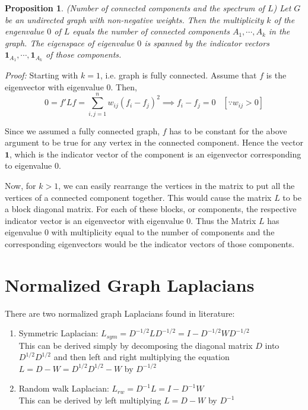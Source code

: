 \documentclass[10pt,a4paper, nocenter]{report}
\newtheorem{prop}{Proposition}
\begin{document}
			\begin{prop}
				(Number of connected components and the spectrum of $L$) Let $G$ be an undirected graph with non-negative weights. Then the multiplicity $k$ of the engenvalue $0$ of $L$ equals the number of connected components $A_{1},\cdots,A_{k}$ in the graph. The eigenspace of eigenvalue $0$ is spanned by the indicator vectors $\mathbf{1}_{A_{1}},\cdots,\mathbf{1}_{A_{k}}$ of those components.				
			\end{prop}
			\textit{Proof:}
			Starting with $k=1$, i.e. graph is fully connected. Assume that $f$ is the eigenvector with eigenvalue $0$. Then,
			$$ 0 = f'Lf = \sum_{i,j=1}^{n}w_{ij}(f_{i}-f_{j})^{2} \implies f_{i} - f_{j}=0 \hspace{10pt}[\because w_{ij} > 0]$$
			
			Since we assumed a fully connected graph, $f$ has to be constant for the above argument to be true for any vertex in the connected component. Hence the vector $\textbf{1}$, which is the indicator vector of the component is an eigenvector corresponding to eigenvalue $0$. 
			
			Now, for $k>1$, we can easily rearrange the vertices in the matrix to put all the vertices of a connected component together. This would cause the matrix $L$ to be a block diagonal matrix. For each of these blocks, or components, the respective indicator vector is an eigenvector with eigenvalue 0. Thus the Matrix $L$ has eigenvalue $0$ with multiplicity equal to the number of components and the corresponding eigenvectors would be the indicator vectors of those components. 
			$ $\\
			
			
			\section{Normalized Graph Laplacians}
			There are two normalized graph Laplacians found in literature:
			\begin{enumerate}
				\item{Symmetric Laplacian:} $L_{sym} = D^{-1/2}LD^{-1/2} = I - D^{-1/2}WD^{-1/2}$\\
					This can be derived simply by decomposing the diagonal matrix $D$ into $D^{1/2}D^{1/2}$ and then left and right multiplying the equation $L=D-W = D^{1/2}D^{1/2}-W$ by $D^{-1/2}$
				\item{Random walk Laplacian:} $L_{rw} = D^{-1}L = I-D^{-1}W$\\
					This can be derived by left multiplying $L=D-W$ by $D^{-1}$
			\end{enumerate}
\end{document}
